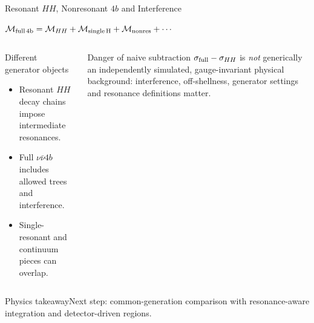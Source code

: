 \documentclass[aspectratio=1610,english]{beamer}
\newcommand{\src}[1]{\vfill{\par\color{black!65}\fontsize{6.4}{7.4}\selectfont\emph{Source:} #1\par}}
\newcommand{\key}[1]{\begin{alertblock}{Physics takeaway}\small  #1\end{alertblock}}
\begin{document}
\begin{frame}[t]{Resonant $HH$, Nonresonant $4b$ and Interference}
\small

\begin{center}\large
$\mathcal M_{\rm full\,4b}=\mathcal M_{HH}+\mathcal M_{\rm single\,H}+\mathcal M_{\rm nonres}+\cdots$
\end{center}
\begin{columns}%
\begin{block}{Different generator objects}
\begin{itemize}
\justifying 
\item Resonant $HH$ decay chains impose intermediate resonances.
\item Full $\nu\bar\nu4b$ includes allowed trees and interference.
\item Single-resonant and continuum pieces can overlap.
\end{itemize}\end{block}
\begin{alertblock}{Danger of naive subtraction}
\justifying 
$\sigma_{\rm full}-\sigma_{HH}$ is \emph{not} generically an independently simulated, gauge-invariant physical background: interference, off-shellness, generator settings and resonance definitions matter.
\end{alertblock}
\end{columns}
\key{Next step: common-generation comparison with resonance-aware integration and detector-driven regions.}

\end{frame}
\end{document}
